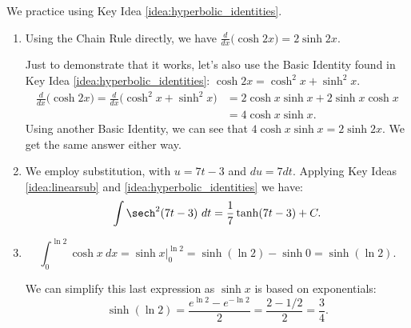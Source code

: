 We practice using Key Idea \ref{idea:hyperbolic_identities}.\\

{\begin{enumerate}
\item		Using the Chain Rule directly, we have $\frac{d}{dx} \big(\cosh 2x\big) = 2\sinh 2x$.

Just to demonstrate that it works, let's also use the Basic Identity found in Key Idea \ref{idea:hyperbolic_identities}: $\cosh 2x = \cosh^2x+\sinh^2x$.
\begin{align*}\frac{d}{dx}\big(\cosh 2x\big) = \frac{d}{dx}\big(\cosh^2x+\sinh^2x\big) &= 2\cosh x\sinh x+ 2\sinh x\cosh x\\ &= 4\cosh x\sinh x.
\end{align*}
Using another Basic Identity, we can see that $4\cosh x\sinh x = 2\sinh 2x$. We get the same answer either way.

\item	  We employ substitution, with $u = 7t-3$ and $du = 7dt$. Applying Key Ideas \ref{idea:linearsub}  and \ref{idea:hyperbolic_identities} we have:
$$ \int \sech^2 (7t-3)\ dt = \frac17\tanh (7t-3) + C.$$

\item		$$\int_0^{\ln 2} \cosh x\ dx = \sinh x\Big|_0^{\ln 2} = \sinh (\ln 2) - \sinh 0 = \sinh(\ln 2).$$

We can simplify this last expression as $\sinh x$ is based on exponentials:
$$\sinh(\ln 2) = \frac{e^{\ln 2}-e^{-\ln 2}}2 = \frac{2-1/2}{2} = \frac34.$$
\end{enumerate}
\baselineskip
}\\

